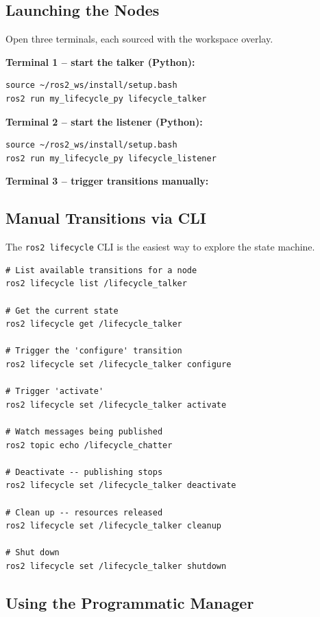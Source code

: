 \documentclass[12pt,a4paper]{article}
\newcommand{\code}[1]{\texttt{#1}}
\begin{document}
\subsection{Launching the Nodes}

Open three terminals, each sourced with the workspace overlay.

\textbf{Terminal 1 -- start the talker (Python):}
\begin{lstlisting}[style=bash]
source ~/ros2_ws/install/setup.bash
ros2 run my_lifecycle_py lifecycle_talker
\end{lstlisting}

\textbf{Terminal 2 -- start the listener (Python):}
\begin{lstlisting}[style=bash]
source ~/ros2_ws/install/setup.bash
ros2 run my_lifecycle_py lifecycle_listener
\end{lstlisting}

\textbf{Terminal 3 -- trigger transitions manually:}

\subsection{Manual Transitions via CLI}

The \code{ros2 lifecycle} CLI is the easiest way to explore the state machine.

\begin{lstlisting}[style=bash,caption={CLI transition commands}]
# List available transitions for a node
ros2 lifecycle list /lifecycle_talker

# Get the current state
ros2 lifecycle get /lifecycle_talker

# Trigger the 'configure' transition
ros2 lifecycle set /lifecycle_talker configure

# Trigger 'activate'
ros2 lifecycle set /lifecycle_talker activate

# Watch messages being published
ros2 topic echo /lifecycle_chatter

# Deactivate -- publishing stops
ros2 lifecycle set /lifecycle_talker deactivate

# Clean up -- resources released
ros2 lifecycle set /lifecycle_talker cleanup

# Shut down
ros2 lifecycle set /lifecycle_talker shutdown
\end{lstlisting}

\subsection{Using the Programmatic Manager}
\end{document}
